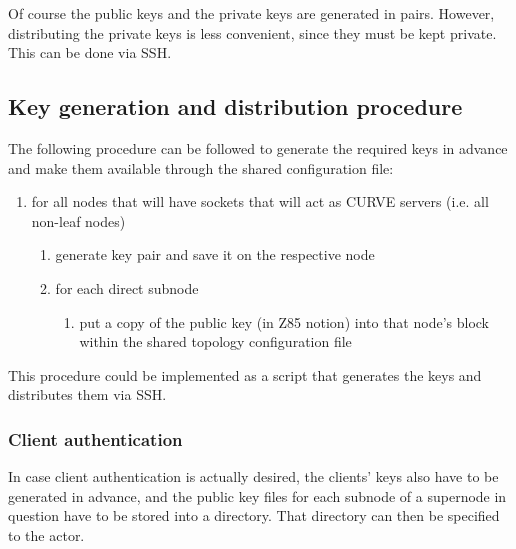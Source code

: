 Of course the public keys and the private keys are generated in pairs. However,
distributing the private keys is less convenient, since they must be kept
private. This can be done via SSH.




\subsection{Key generation and distribution procedure}
The following procedure can be followed to generate the required keys in
advance and make them available through the shared configuration file:

\begin{enumerate}
	\item for all nodes that will have sockets that will act as CURVE servers (i.e. all non-leaf nodes)
	\begin{enumerate}
		\item generate key pair and save it on the respective node
		\item for each direct subnode
		\begin{enumerate}
			\item put a copy of the public key (in Z85 notion) into that node's block within the shared topology configuration file
		\end{enumerate}
	\end{enumerate}
\end{enumerate}

This procedure could be implemented as a script that generates the keys and
distributes them via \gls{SSH}.

\subsubsection{Client authentication}
In case client authentication is actually desired, the clients' keys also have
to be generated in advance, and the public key files for each subnode of a
supernode in question have to be stored into a directory. That directory can
then be specified to the  actor.

